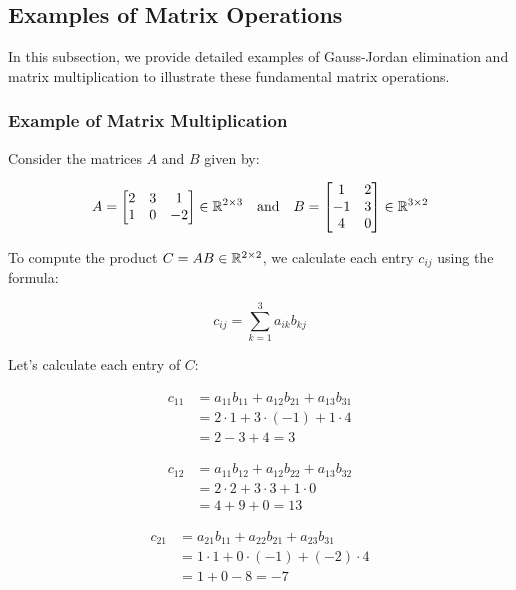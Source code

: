 \subsection{Examples of Matrix Operations}

In this subsection, we provide detailed examples of Gauss-Jordan elimination and matrix multiplication to illustrate these fundamental matrix operations.

\subsubsection{Example of Matrix Multiplication}

Consider the matrices \(A\) and \(B\) given by:

\[
    A = 
    \begin{bmatrix}
    2 & 3 & 1 \\
    1 & 0 & -2
    \end{bmatrix} \in \mathbb{R}^{2 \times 3}
    \quad \text{and} \quad
    B = 
    \begin{bmatrix}
    1 & 2 \\
    -1 & 3 \\
    4 & 0
    \end{bmatrix} \in \mathbb{R}^{3 \times 2}
\]

To compute the product \(C = AB \in \mathbb{R}^{2 \times 2}\), we calculate each entry \(c_{ij}\) using the formula:

\[
    c_{ij} = \sum_{k=1}^{3} a_{ik} b_{kj}
\]

Let's calculate each entry of \(C\):

\begin{align*}
    c_{11} &= a_{11}b_{11} + a_{12}b_{21} + a_{13}b_{31} \\
    &= 2 \cdot 1 + 3 \cdot (-1) + 1 \cdot 4 \\
    &= 2 - 3 + 4 = 3
\end{align*}

\begin{align*}
    c_{12} &= a_{11}b_{12} + a_{12}b_{22} + a_{13}b_{32} \\
    &= 2 \cdot 2 + 3 \cdot 3 + 1 \cdot 0 \\
    &= 4 + 9 + 0 = 13
\end{align*}

\begin{align*}
    c_{21} &= a_{21}b_{11} + a_{22}b_{21} + a_{23}b_{31} \\
    &= 1 \cdot 1 + 0 \cdot (-1) + (-2) \cdot 4 \\
    &= 1 + 0 - 8 = -7
\end{align*}

